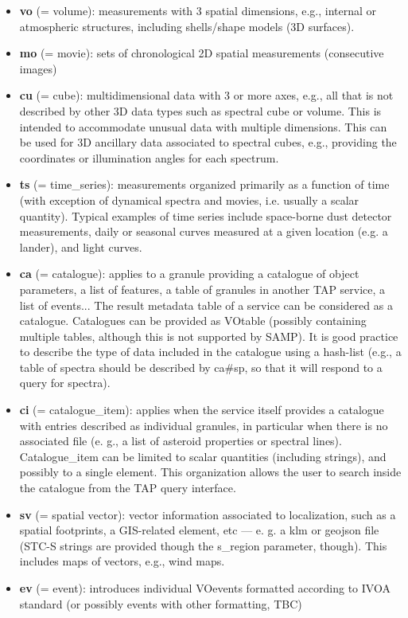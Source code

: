 \documentclass[11pt,a4paper]{ivoa}
\begin{document}
\begin{itemize}
\item \textbf{vo }(= volume): measurements with 3 spatial dimensions, e.g., internal or atmospheric structures, including shells/shape models (3D surfaces).

\item \textbf{mo }(= movie): sets of chronological 2D spatial measurements (consecutive images)

\item \textbf{cu }(= cube): multidimensional data with 3 or more axes, e.g., all that is not described by other 3D data types such as spectral cube or volume. This is intended to accommodate unusual data with multiple dimensions. This can be used for 3D ancillary data associated to spectral cubes, e.g., providing the coordinates or illumination angles for each spectrum.

\item \textbf{ts }(= time\_series): measurements organized primarily as a function of time (with exception of dynamical spectra and movies, i.e. usually a scalar quantity). Typical examples of time series include space-borne dust detector measurements, daily or seasonal curves measured at a given location (e.g. a lander), and light curves.

\item \textbf{ca }(= catalogue): applies to a granule providing a catalogue of object parameters, a list of features, a table of granules in another TAP service, a list of events... The result metadata table of a service can be considered as a catalogue. Catalogues can be provided as VOtable (possibly containing multiple tables, although this is not supported by SAMP). It is good practice to describe the type of data included in the catalogue using a hash-list (e.g., a table of spectra should be described by ca\#sp, so that it will respond to a query for spectra).

\item \textbf{ci }(= catalogue\_item): applies when the service itself provides a catalogue with entries described as individual granules, in particular when there is no associated file (e. g., a list of asteroid properties or spectral lines). Catalogue\_item can be limited to scalar quantities (including strings), and possibly to a single element. This organization allows the user to search inside the catalogue from the TAP query interface.

\item \textbf{sv} (= spatial vector): vector information associated to localization, such as a spatial footprints, a GIS-related element, etc —  e. g. a klm or geojson file (STC-S strings are provided though the s\_region parameter, though). This includes maps of vectors, e.g., wind maps.

\item \textbf{ev} (= event): introduces individual VOevents formatted according to IVOA standard (or possibly events with other formatting, TBC)

\end{itemize}
\end{document}
